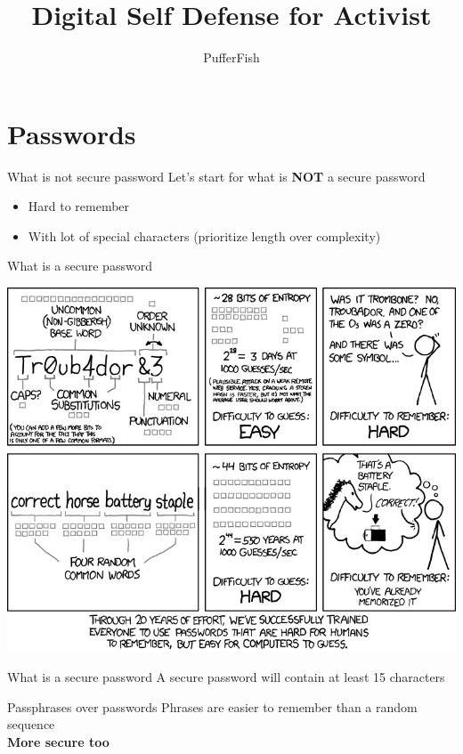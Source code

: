 \documentclass[11pt]{beamer}
\author{PufferFish}
\title{Digital Self Defense for Activist}
\begin{document}
\begin{frame}
\titlepage
\end{frame}

\begin{frame}
\tableofcontents
\end{frame}

\section{Passwords}
\begin{frame}{What is not secure password}
Let's start for what is \textbf{NOT} a secure password
\begin{itemize}
\item Hard to remember
\item With lot of special characters (prioritize length over complexity)
\end{itemize} 
\end{frame}
\begin{frame}{What is a secure password}
\begin{center}
\includegraphics[scale=0.30]{pictures/password_strength.png}
\end{center}
\end{frame}
\begin{frame}{What is a secure password}
A secure password will contain at least 15 characters\\
\end{frame}
\begin{frame}{Passphrases over passwords}
Phrases are easier to remember than a random sequence\\
\textbf{More secure too}
\end{frame}
\end{document}
